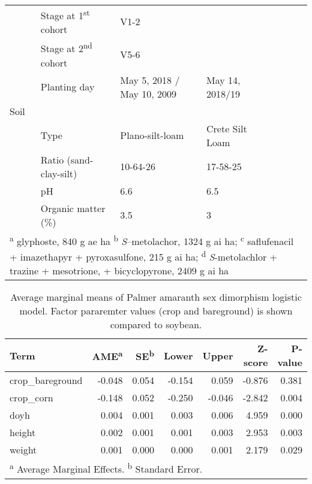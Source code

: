 \begin{table}[!h]
{\begin{tabular}[t]{lllllll}
 & Stage at 1\textsuperscript{st} cohort & V1-2 &  &  &  & \\

 & Stage at 2\textsuperscript{nd} cohort & V5-6 &  &  &  & \\

\multirow{-6}{*}{\raggedright\arraybackslash } & Planting day & May 5, 2018 / May 10, 2009 & May 14, 2018/19 &  &  & \\

Soil &  &  &  &  &  & \\

 & Type & Plano-silt-loam & Crete Silt Loam &  &  & \\

 & Ratio (sand-clay-silt) & 10-64-26 & 17-58-25 &  &  & \\

 & pH & 6.6 & 6.5 &  &  & \\

\multirow{-4}{*}{\raggedright\arraybackslash } & Organic matter (\%) & 3.5 & 3 &  &  & \\
\bottomrule
\multicolumn{7}{l}{\rule{0pt}{1em}\textsuperscript{a} glyphoste, 840 g ae ha \textsuperscript{b} \emph{S}--metolachor, 1324 g ai ha; \textsuperscript{c} saflufenacil + imazethapyr + pyroxasulfone, 215 g ai ha; \textsuperscript{d} \emph{S}-metolachlor + trazine + mesotrione, + bicyclopyrone, 2409 g ai ha}\\
\end{tabular}}
\end{table}





\begin{table}[!h]

\caption{\label{tab:unnamed-chunk-3}Average marginal means of Palmer amaranth sex dimorphism logistic model. Factor pararemter values (crop and bareground) is shown compared to soybean.}
\centering
\fontsize{10}{12}\selectfont
\begin{tabular}[t]{lrrrrrr}
\toprule
Term & AME\textsuperscript{a} & SE\textsuperscript{b} & Lower & Upper & Z-score & P-value\\
\midrule
crop\_bareground & -0.048 & 0.054 & -0.154 & 0.059 & -0.876 & 0.381\\

crop\_corn & -0.148 & 0.052 & -0.250 & -0.046 & -2.842 & 0.004\\

doyh & 0.004 & 0.001 & 0.003 & 0.006 & 4.959 & 0.000\\

height & 0.002 & 0.001 & 0.001 & 0.003 & 2.953 & 0.003\\

weight & 0.001 & 0.000 & 0.000 & 0.001 & 2.179 & 0.029\\
\bottomrule
\multicolumn{7}{l}{\rule{0pt}{1em}\textsuperscript{a} Average Marginal Effects. \textsuperscript{b} Standard Error.}\\
\end{tabular}
\end{table}